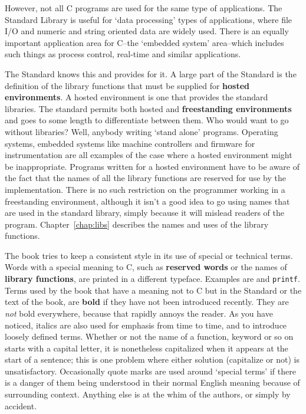   However, not all C programs are used for the same type of applications.
   The Standard Library is useful for `data processing' types of
   applications, where file I/O and numeric and string oriented data are
   widely used. There is an equally important application area for C--the
   `embedded system' area--which includes such things as process
   control, real-time and similar applications.


  The Standard knows this and provides for it. A large part of the Standard
   is the definition of the library functions that must be supplied for
   \textbf{hosted environments}. A hosted environment is one that provides
   the standard libraries. The standard permits both hosted and
   \textbf{freestanding environments} and goes to some length to
   differentiate between them. Who would want to go without libraries? Well,
   anybody writing `stand alone' programs. Operating systems, embedded
   systems like machine controllers and firmware for instrumentation are all
   examples of the case where a hosted environment might be inappropriate.
   Programs written for a hosted environment have to be aware of the fact that
   the names of all the library functions are reserved for use by the
   implementation. There is no such restriction on the programmer working in a
   freestanding environment, although it isn't a good idea to go using names
   that are used in the standard library, simply because it will mislead
   readers of the program.
   Chapter~\ref{chap:libs} describes the names and uses
   of the library functions.


 

  

  The book tries to keep a consistent style in its use of special or
   technical terms. Words with a special meaning to C, such as
   \textbf{reserved words} or the names of \textbf{library functions}, are
   printed in a different typeface. Examples are \kint{} and
   \texttt{printf}. Terms used by the book that have a meaning not to C
   but in the Standard or the text of the book, are \textbf{bold} if they
   have not been introduced recently. They are \textit{not} bold everywhere,
   because that rapidly annoys the reader. As you have noticed, italics are
   also used for emphasis from time to time, and to introduce loosely defined
   terms. Whether or not the name of a function, keyword or so on starts with
   a capital letter, it is nonetheless capitalized when it appears at the
   start of a sentence; this is one problem where either solution (capitalize
   or not) is unsatisfactory. Occasionally quote marks are used around
   `special terms' if there is a danger of them being understood in
   their normal English meaning because of surrounding context. Anything else
   is at the whim of the authors, or simply by accident.


